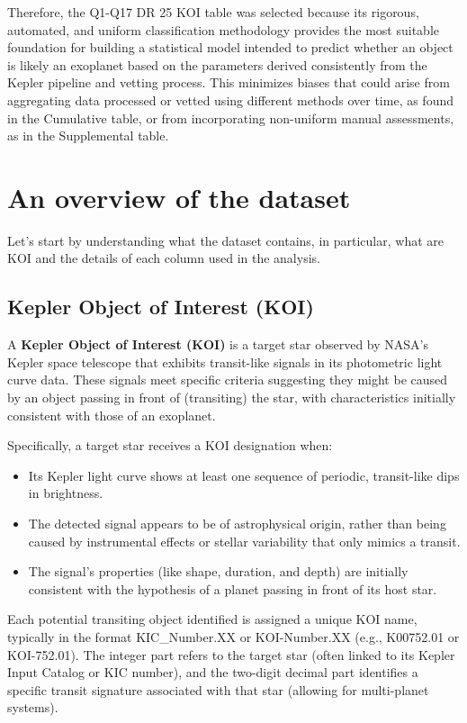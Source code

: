 Therefore, the Q1-Q17 DR 25 KOI table was selected because its rigorous, automated, and uniform classification methodology provides the most suitable foundation for building a statistical model intended to predict whether an object is likely an exoplanet based on the parameters derived consistently from the Kepler pipeline and vetting process. This minimizes biases that could arise from aggregating data processed or vetted using different methods over time, as found in the Cumulative table, or from incorporating non-uniform manual assessments, as in the Supplemental table.

\section{An overview of the dataset}
Let's start by understanding what the dataset contains, in particular, what are KOI and the details of each column used in the analysis.

\subsection{Kepler Object of Interest (KOI)}
A \textbf{Kepler Object of Interest (KOI)} is a target star observed by NASA's Kepler space telescope that exhibits transit-like signals in its photometric light curve data. These signals meet specific criteria suggesting they might be caused by an object passing in front of (transiting) the star, with characteristics initially consistent with those of an exoplanet.

Specifically, a target star receives a KOI designation when:
\begin{itemize}
    \item Its Kepler light curve shows at least one sequence of periodic, transit-like dips in brightness.
    \item The detected signal appears to be of astrophysical origin, rather than being caused by instrumental effects or stellar variability that only mimics a transit.
    \item The signal's properties (like shape, duration, and depth) are initially consistent with the hypothesis of a planet passing in front of its host star.
\end{itemize}

Each potential transiting object identified is assigned a unique KOI name, typically in the format KIC\_Number.XX or KOI-Number.XX (e.g., K00752.01 or KOI-752.01). The integer part refers to the target star (often linked to its Kepler Input Catalog or KIC number), and the two-digit decimal part identifies a specific transit signature associated with that star (allowing for multi-planet systems).


